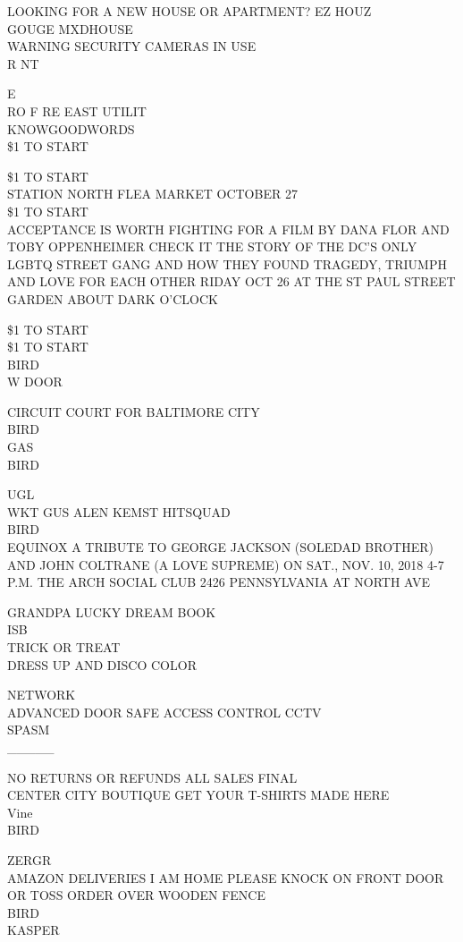 \documentclass[10pt,letterpaper]{article}
\begin{document}
LOOKING FOR A NEW HOUSE OR APARTMENT?  EZ HOUZ\\
GOUGE MXDHOUSE\\
WARNING SECURITY CAMERAS IN USE\\
R NT

E\\
RO F RE EAST UTILIT\\
KNOWGOODWORDS\\
\$1 TO START

\$1 TO START\\
STATION NORTH FLEA MARKET OCTOBER 27\\
\$1 TO START\\
ACCEPTANCE IS WORTH FIGHTING FOR A FILM BY DANA FLOR AND TOBY OPPENHEIMER CHECK IT THE STORY OF THE DC'S ONLY LGBTQ STREET GANG AND HOW THEY FOUND TRAGEDY, TRIUMPH AND LOVE FOR EACH OTHER RIDAY OCT 26 AT THE ST PAUL STREET GARDEN ABOUT DARK O'CLOCK

\$1 TO START\\
\$1 TO START\\
BIRD\\
W DOOR

CIRCUIT COURT FOR BALTIMORE CITY\\
BIRD\\
GAS\\
BIRD

UGL\\
WKT GUS ALEN KEMST HITSQUAD\\
BIRD\\
EQUINOX A TRIBUTE TO GEORGE JACKSON (SOLEDAD BROTHER) AND JOHN COLTRANE (A LOVE SUPREME) ON SAT., NOV. 10, 2018 4{-}7 P.M. THE ARCH SOCIAL CLUB 2426 PENNSYLVANIA AT NORTH AVE

GRANDPA LUCKY DREAM BOOK\\
ISB\\
TRICK OR TREAT\\
DRESS UP AND DISCO COLOR

NETWORK\\
ADVANCED DOOR SAFE ACCESS CONTROL CCTV\\
SPASM\\
\_\_\_\_\_

NO RETURNS OR REFUNDS ALL SALES FINAL\\
CENTER CITY BOUTIQUE GET YOUR T{-}SHIRTS MADE HERE\\
Vine\\
BIRD

ZERGR\\
AMAZON DELIVERIES I AM HOME PLEASE KNOCK ON FRONT DOOR OR TOSS ORDER OVER WOODEN FENCE\\
BIRD\\
KASPER
\end{document}
